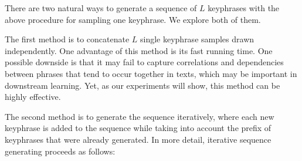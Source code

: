 
There are two natural ways to generate a sequence of $L$ keyphrases with the above procedure for sampling one keyphrase. We explore both of them.

The first method is to concatenate $L$ single keyphrase samples drawn independently. 
One advantage of this method is its fast running time. One possible downside is that it may fail to capture correlations and dependencies between phrases that tend to occur together in texts, which may be important in downstream learning. Yet, as our experiments will show, this method can be highly effective.

The second method is to generate the sequence iteratively, where each new keyphrase is added to the sequence while taking into account the prefix of keyphrases that were already generated. In more detail, iterative sequence generating proceeds as follows:




